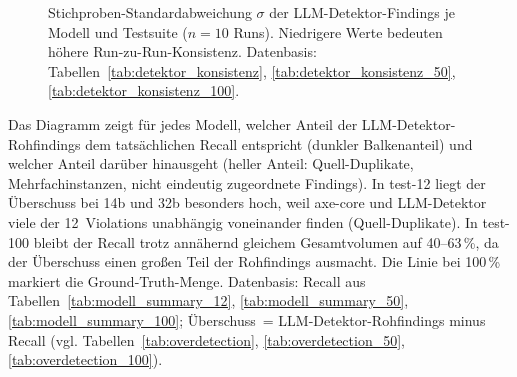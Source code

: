 \begin{figure}[htbp]
\centering
{}
\caption[\acs{LLM}-Konsistenz $\sigma$ im Suite-Vergleich]{Stichproben-Standardabweichung $\sigma$ der \ac{LLM}-Detektor-Findings je Modell und Testsuite ($n=10$ Runs). Niedrigere Werte bedeuten höhere Run-zu-Run-Konsistenz. Datenbasis: Tabellen~\ref{tab:detektor_konsistenz}, \ref{tab:detektor_konsistenz_50}, \ref{tab:detektor_konsistenz_100}.}
\label{fig:graph_sigma}
\end{figure}

\clearpage

\label{app:graph_overdetektion}

\noindent Das Diagramm zeigt für jedes Modell, welcher Anteil der \ac{LLM}-Detektor-Rohfindings dem tatsächlichen Recall entspricht (dunkler Balkenanteil) und welcher Anteil darüber hinausgeht (heller Anteil: Quell-Duplikate, Mehrfachinstanzen, nicht eindeutig zugeordnete Findings). In test-12 liegt der Überschuss bei 14b und 32b besonders hoch, weil axe-core und \ac{LLM}-Detektor viele der 12~Violations unabhängig voneinander finden (Quell-Duplikate). In test-100 bleibt der Recall trotz annähernd gleichem Gesamtvolumen auf 40--63\,\%, da der Überschuss einen großen Teil der Rohfindings ausmacht. Die Linie bei 100\,\% markiert die Ground-Truth-Menge. Datenbasis: Recall aus Tabellen~\ref{tab:modell_summary_12}, \ref{tab:modell_summary_50}, \ref{tab:modell_summary_100}; Überschuss~= \ac{LLM}-Detektor-Rohfindings minus Recall (vgl. Tabellen~\ref{tab:overdetection}, \ref{tab:overdetection_50}, \ref{tab:overdetection_100}).

